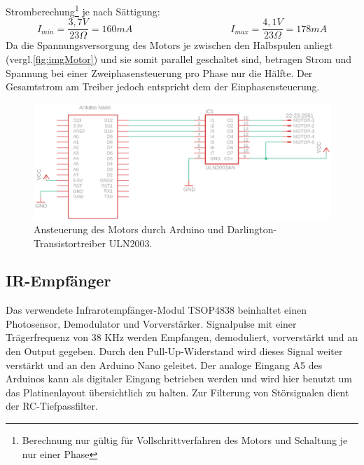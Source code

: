 \documentclass[11pt, titlepage, fleqn]{report}
\begin{document}
				\vspace{5em}
				Stromberechung\footnote{Berechnung nur gültig für Vollschrittverfahren des Motors und Schaltung je nur einer Phase} je nach Sättigung:
				\begin{equation}
					I_{min}=\frac{3,7 V}{23 \Omega}=160 mA \hspace{10em}
					I_{max}=\frac{4,1 V}{23 \Omega}=178 mA
				\end{equation}
				\newline
				Da die Spannungsversorgung des Motors je zwischen den Halbspulen anliegt (vergl.\ref{fig:imgMotor}) und sie somit parallel geschaltet sind, betragen Strom und Spannung bei einer Zweiphasensteuerung pro Phase nur die Hälfte. Der Gesamtstrom am Treiber jedoch entspricht dem der Einphasensteuerung.
				\begin{figure}[htbp]
					\centering
					\includegraphics[width=\linewidth]{./img/Motorsteuerung.png}
					\caption{ Ansteuerung des Motors durch Arduino und  Darlington-Transistortreiber ULN2003.
					\label{fig:imgMotorsteuerung}}
				\end{figure}
			\newpage
			\subsection{IR-Empfänger}
			\label{sec:IR}
				Das verwendete Infrarotempfänger-Modul TSOP4838 beinhaltet einen Photosensor, Demodulator und Vorverstärker. Signalpulse mit einer Trägerfrequenz von 38 KHz werden Empfangen, demoduliert, vorverstärkt und an den Output gegeben. Durch den Pull-Up-Widerstand wird dieses Signal weiter verstärkt und an den Arduino Nano geleitet. Der analoge Eingang A5 des Arduinos kann als digitaler Eingang betrieben werden und wird hier benutzt um das Platinenlayout übersichtlich zu halten. Zur Filterung von Störsignalen dient der RC-Tiefpassfilter.
\end{document}
